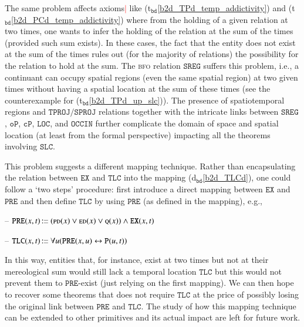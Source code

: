 \documentclass[ao]{iosart2x}
\newcommand{\nb}[1]{\textcolor{red}{$|$}\marginpar{\hspace*{-0cm}\parbox{20mm}{\scriptsize\raggedright\textcolor{red}{#1}}}}
\newcommand{\bflist}{\begin{list}{}{\setlength{\topsep}{2mm}\setlength{\parsep}{0mm}\setlength{\leftmargin}{9.2mm}\setlength{\labelwidth}{8mm}}}
\newcommand{\eflist}{\end{list}}
\newcommand{\bdDefLabel}{\textrm{d$_\texttt{bd}$}}
\newcommand{\bdThrLabel}{\textrm{t$_\texttt{bd}$}}
\newcommand{\refbddf}[1]{({\bdDefLabel}\ref{#1})}
\newcommand{\refbdth}[1]{({\bdThrLabel}\ref{#1})}
\newcommand{\pr}[1]{\mathtt{#1}}
\newcommand{\ifif}{\leftrightarrow}
\newcommand\textequal{%
 \rule[.08ex]{5pt}{0.35pt}\llap{\rule[.78ex]{5pt}{0.35pt}}}
\newcommand{\sdef}{{\hspace{1.5pt}:\hspace{-2.5pt}\textequal\hspace{3pt}}}
\newcommand{\bfo}{{\textsc{bfo}}}
\newcommand {\EDdcat} {\textsc{ed}}
\newcommand {\PDdcat} {\textsc{pd}}
\newcommand {\Qdcat} {\textsc{q}}
\newcommand {\Pd} {\ensuremath{\pr{P}}}
\newcommand {\PREd} {\ensuremath{\pr{PRE}}}
\newcommand {\SLCd} {\ensuremath{\pr{SLC}}}
\newcommand {\TLCd} {\ensuremath{\pr{TLC}}}
\newcommand{\bfocpart}{\pr{cP}}
\newcommand{\bfoopart}{\pr{oP}}
\newcommand{\bfoexist}{\pr{EX}}
\newcommand{\bfooccurs}{\pr{OCCIN}}
\newcommand{\bfolocated}{\pr{LOC}}
\newcommand{\bfosregof}{\pr{SREG}}
\newcommand{\bfotproj}{\pr{TPROJ}}
\newcommand{\bfosproj}{\pr{SPROJ}}
\begin{document}
The same problem affects axioms\nb{CM: questi non sono axioms} like \refbdth{b2d_TPd_temp_addictivity}  and \refbdth{b2d_PCd_temp_addictivity} where from the holding of a given relation at two times, one wants to infer the  holding of the relation at the sum of the times (provided such sum exists). In these cases, the fact that the entity does not exist at the sum of the times rules out (for the majority of relations) the possibility for the relation to hold at the sum. The {\bfo} relation $\bfosregof$ suffers this problem, i.e., a continuant can occupy spatial regions (even the same spatial region) at two given times without having a spatial location at the sum of these times (see the counterexample for \refbdth{b2d_TPd_up_slc}). %
The presence of spatiotemporal regions and $\bfotproj/\bfosproj$ relations together with the intricate links between $\bfosregof$, $\bfoopart$, $\bfocpart$, $\bfolocated$, and $\bfooccurs$ further complicate the domain of space and spatial location (at least from the formal perspective) impacting all the theorems involving $\SLCd$.

This problem suggests a different mapping technique. Rather than encapsulating the relation between $\bfoexist$ and $\TLCd$ into the mapping  \refbddf{b2d_TLCd}, one could follow a `two steps' procedure: first introduce a direct mapping between $\bfoexist$ and $\PREd$ and then define $\TLCd$ by using $\PREd$ (as defined in the mapping), e.g.,
%
\bflist
\item[--] $\PREd(x,t) \sdef (\PDdcat(x) \lor \EDdcat(x) \lor \Qdcat(x)) \land \bfoexist(x,t)$
\item[--] $\TLCd(x,t) \sdef \forall u(\PREd(x,u) \ifif \Pd(u,t))$
\eflist
%  
In this way, entities that, for instance, exist at two times but not at their mereological sum would still lack a temporal location $\TLCd$ but this would not prevent them to $\PREd$-exist (just relying on the first mapping). We can then hope to recover some theorems that does not require $\TLCd$ at the price of possibly losing the original link between $\PREd$ and $\TLCd$. The study of how this mapping technique can be extended to other primitives and its actual impact are left for future work.   
\end{document}
